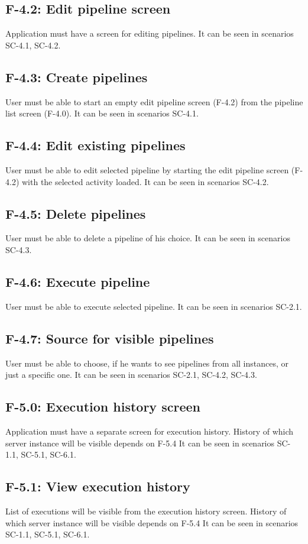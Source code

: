 \subsection*{F-4.2: Edit pipeline screen}
Application must have a screen for editing pipelines. It can be seen in scenarios SC-4.1, SC-4.2.
\subsection*{F-4.3: Create pipelines}
User must be able to start an empty edit pipeline screen (F-4.2) from the pipeline list screen (F-4.0). It can be seen in scenarios SC-4.1.
\subsection*{F-4.4: Edit existing pipelines}
User must be able to edit selected pipeline by starting the edit pipeline screen (F-4.2) with the selected activity loaded. It can be seen in scenarios SC-4.2.
\subsection*{F-4.5: Delete pipelines}
User must be able to delete a pipeline of his choice. It can be seen in scenarios SC-4.3.
\subsection*{F-4.6: Execute pipeline}
User must be able to execute selected pipeline. It can be seen in scenarios SC-2.1.
\subsection*{F-4.7: Source for visible pipelines}
User must be able to choose, if he wants to see pipelines from all instances, or just a specific one. It can be seen in scenarios SC-2.1, SC-4.2, SC-4.3.
\subsection*{F-5.0: Execution history screen}
Application must have a separate screen for execution history. History of which server instance will be visible depends on F-5.4 It can be seen in scenarios SC-1.1, SC-5.1, SC-6.1.
\subsection*{F-5.1: View execution history}
List of executions will be visible from the execution history screen. History of which server instance will be visible depends on F-5.4 It can be seen in scenarios SC-1.1, SC-5.1, SC-6.1.

